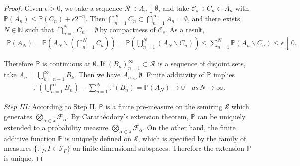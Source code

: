 \documentclass{article}
\numberwithin{equation}{section}
\renewcommand{\P}{\mathbb{P}}
\theoremstyle{plain}
\theoremstyle{definition}
\begin{document}
\begin{proof}
Given $\epsilon>0$, we take a sequence $\mathscr{R}\ni A_n\downarrow\emptyset$, and take $\mathscr{C}_s\ni C_n\subset A_n$ with $\P(A_n)\leq\P(C_n)+\epsilon2^{-n}$. Then $\bigcap_{n=1}^\infty C_n\subset\bigcap_{n=1}^\infty A_n=\emptyset$, and there exists $N\in\mathbb{N}$ such that $\bigcap_{n=1}^N C_n=\emptyset$ by compactness of $\mathscr{C}_s$. As a result,
\begin{align*}
	\P(A_N)=\P\left(A_N\backslash\left(\bigcap_{n=1}^N C_n\right)\right)=\P\left(\bigcup_{n=1}^N(A_N\backslash C_n)\right)\leq\sum_{n=1}^N\P(A_n\backslash C_n) \leq\epsilon\downarrow 0.
\end{align*}

Therefore $\P$ is continuous at $\emptyset$. If $(B_n)_{n=1}^\infty\subset\mathscr{R}$ is a sequence of disjoint sets, take $A_n=\bigcup_{k=n+1}^\infty B_k$. Then we have $A_n\downarrow \emptyset$. Finite additivity of $\P$ implies
\begin{align*}
	\P\left(\bigcup_{n=1}^\infty B_n\right) - \sum_{n=1}^N\P(B_n) = \P(A_N)\to 0\quad \textit{as}\ N\to\infty.
\end{align*}

\textit{Step III:} According to Step II, $\P$ is a finite pre-measure on the semiring $\mathscr{S}$ which generates $\bigotimes_{\alpha\in J}\mathscr{F}_\alpha$. By Carathéodory's extension theorem, $\P$ can be uniquely extended to a probability measure $\bigotimes_{\alpha\in J}\mathscr{F}_\alpha$. On the other hand, the finite additive function $\P$ is uniquely defined on $\mathscr{S}$, which is specified by the family of measures $\{\P_I,I\in\mathcal{I}_F\}$ on finite-dimensional subspaces. Therefore the extension $\P$ is unique.
\end{proof}
\end{document}
